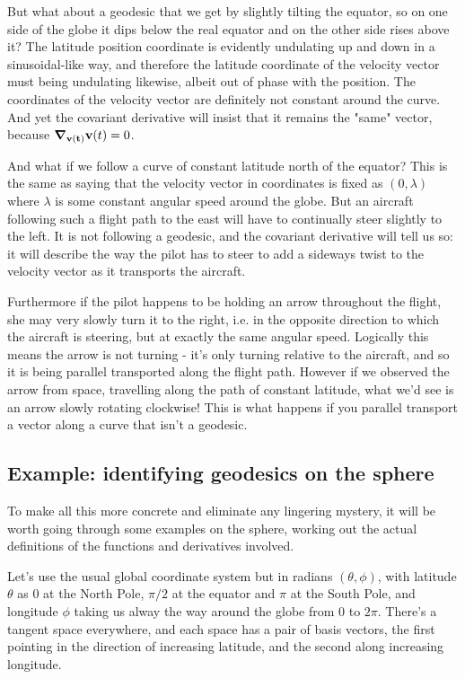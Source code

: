 But what about a geodesic that we get by slightly tilting the equator, so on one side of the globe it dips below the real equator and on the other side rises above it? The latitude position coordinate is evidently undulating up and down in a sinusoidal-like way, and therefore the latitude coordinate of the velocity vector must being undulating likewise, albeit out of phase with the position. The coordinates of the velocity vector are definitely not constant around the curve. And yet the covariant derivative will insist that it remains the "same" vector, because $\grad_{\mathbf{v(t)}} \mathbf{v}(t) = 0$.

And what if we follow a curve of constant latitude north of the equator? This is the same as saying that the velocity vector in coordinates is fixed as $(0, \lambda)$ where $\lambda$ is some constant angular speed around the globe. But an aircraft following such a flight path to the east will have to continually steer slightly to the left. It is not following a geodesic, and the covariant derivative will tell us so: it will describe the way the pilot has to steer to add a sideways twist to the velocity vector as it transports the aircraft.

Furthermore if the pilot happens to be holding an arrow throughout the flight, she may very slowly turn it to the right, i.e. in the opposite direction to which the aircraft is steering, but at exactly the same angular speed. Logically this means the arrow is not turning - it's only turning relative to the aircraft, and so it is being parallel transported along the flight path. However if we observed the arrow from space, travelling along the path of constant latitude, what we'd see is an arrow slowly rotating clockwise! This is what happens if you parallel transport a vector along a curve that isn't a geodesic.

\subsection{Example: identifying geodesics on the sphere}

To make all this more concrete and eliminate any lingering mystery, it will be worth going through some examples on the sphere, working out the actual definitions of the functions and derivatives involved.

Let's use the usual global coordinate system but in radians $(\theta, \phi)$, with latitude $\theta$ as $0$ at the North Pole, $\pi/2$ at the equator and $\pi$ at the South Pole, and longitude $\phi$ taking us alway the way around the globe from $0$ to $2\pi$. There's a tangent space everywhere, and each space has a pair of basis vectors, the first pointing in the direction of increasing latitude, and the second along increasing longitude.

